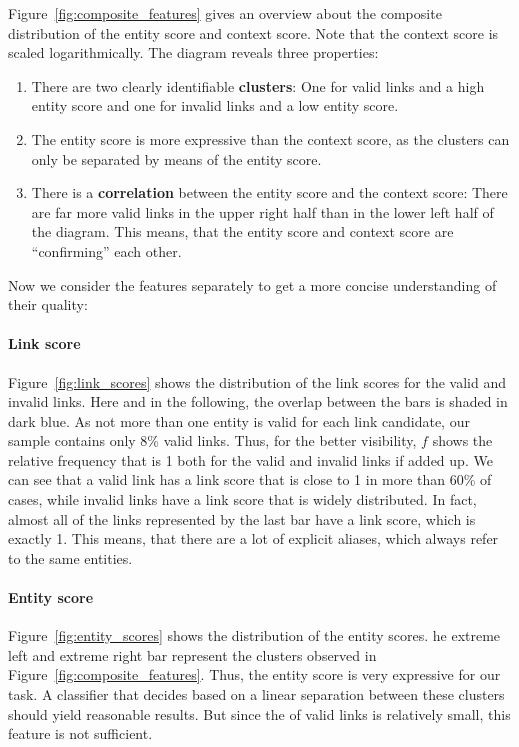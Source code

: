 Figure~\ref{fig:composite_features} gives an overview about the composite distribution of the entity score and context score. Note that the context score is scaled logarithmically. The diagram reveals three properties:

\begin{enumerate}
\item There are two clearly identifiable \textbf{clusters}: One for valid links and a high entity score and one for invalid links and a low entity score. 

\item The entity score is more expressive than the context score, as the clusters can only be separated by means of the entity score.

\item There is a \textbf{correlation} between the entity score and the context score: There are far more valid links in the upper right half than in the lower left half of the diagram. This means, that the entity score and context score are "`confirming"' each other.
\end{enumerate}

Now we consider the features separately to get a more concise understanding of their quality:

\paragraph{Link score}
Figure~\ref{fig:link_scores} shows the distribution of the link scores for the valid and invalid links. Here and in the following, the overlap between the bars is shaded in dark blue. As not more than one entity is valid for each link candidate, our sample contains only 8\% valid links. Thus, for the better visibility, $f$ shows the relative frequency that is 1 both for the valid and invalid links if added up. We can see that a valid link has a link score that is close to 1 in more than 60\% of cases, while invalid links have a link score that is widely distributed. In fact, almost all of the links represented by the last bar have a link score, which is exactly 1. This means, that there are a lot of explicit aliases, which always refer to the same entities. 

\paragraph{Entity score}
Figure~\ref{fig:entity_scores} shows the distribution of the entity scores. he extreme left and extreme right bar represent the clusters observed in Figure~\ref{fig:composite_features}. Thus, the entity score is very expressive for our task. A classifier that decides based on a linear separation between these clusters should yield reasonable results. But since the of valid links is relatively small, this feature is not sufficient.

